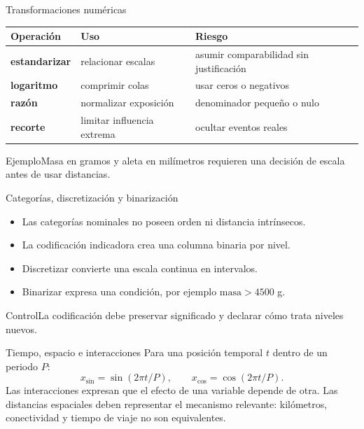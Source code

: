 \documentclass[aspectratio=169,10pt]{beamer}
\begin{document}
\begin{frame}{Transformaciones numéricas}\small
\begin{tabularx}{\textwidth}{>{\bfseries}p{}XX}\toprule Operación & Uso & Riesgo\\\midrule
estandarizar & relacionar escalas & asumir comparabilidad sin justificación\\ logaritmo & comprimir colas & usar ceros o negativos\\ razón & normalizar exposición & denominador pequeño o nulo\\ recorte & limitar influencia extrema & ocultar eventos reales\\\bottomrule\end{tabularx}
\begin{block}{Ejemplo}Masa en gramos y aleta en milímetros requieren una decisión de escala antes de usar distancias.\end{block}
\end{frame}

\begin{frame}{Categorías, discretización y binarización}\small
\begin{itemize}\item Las categorías nominales no poseen orden ni distancia intrínsecos.\item La codificación indicadora crea una columna binaria por nivel.\item Discretizar convierte una escala continua en intervalos.\item Binarizar expresa una condición, por ejemplo $\text{masa}>4500$ g.\end{itemize}
\begin{block}{Control}La codificación debe preservar significado y declarar cómo trata niveles nuevos.\end{block}
\end{frame}

\begin{frame}{Tiempo, espacio e interacciones}\small
Para una posición temporal $t$ dentro de un periodo $P$:
\[x_{\sin}=\sin(2\pi t/P),\qquad x_{\cos}=\cos(2\pi t/P).\]
Las interacciones expresan que el efecto de una variable depende de otra. Las distancias espaciales deben representar el mecanismo relevante: kilómetros, conectividad y tiempo de viaje no son equivalentes.
\end{frame}
\end{document}
